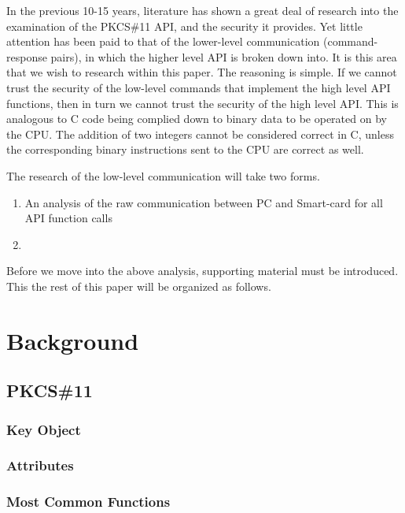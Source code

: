 \documentclass[bsc,frontabs,twoside,singlespacing,parskip,deptreport]{infthesis}     %
\begin{document}
\noindent In the previous 10-15 years, literature has shown a great deal of research into the examination of the PKCS\#11 API, and the security it provides. Yet little attention has been paid to that of the lower-level communication (command-response pairs), in which the higher level API is broken down into. It is this area that we wish to research within this paper. The reasoning is simple. If we cannot trust the security of the low-level commands that implement the high level API functions, then in turn we cannot trust the security of the high level API. This is analogous to C code being complied down to binary data to be operated on by the CPU. The addition of two integers cannot be considered correct in C, unless the corresponding binary instructions sent to the CPU are correct as well.  

The research of the low-level communication will take two forms. 
\begin{enumerate}
\item An analysis of the raw communication between PC and Smart-card for all API function calls
\item 
\end{enumerate}


Before we move into the above analysis, supporting material must be introduced. This the rest of this paper will be organized as follows.




\chapter{Background}

\section{PKCS\#11}

\subsection{Key Object}
\subsection{Attributes}
\subsection{Most Common Functions}
\end{document}
